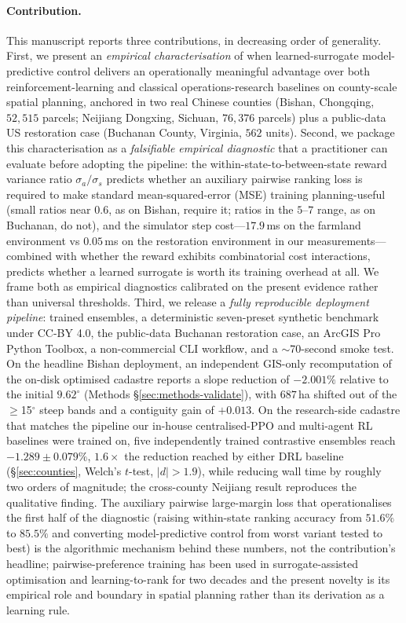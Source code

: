 \documentclass[11pt]{article}
\begin{document}
\paragraph{Contribution.} This manuscript reports three contributions, in decreasing order of generality. First, we present an \emph{empirical characterisation} of when learned-surrogate model-predictive control delivers an operationally meaningful advantage over both reinforcement-learning and classical operations-research baselines on county-scale spatial planning, anchored in two real Chinese counties (Bishan, Chongqing, $52{,}515$ parcels; Neijiang Dongxing, Sichuan, $76{,}376$ parcels) plus a public-data US restoration case (Buchanan County, Virginia, $562$ units). Second, we package this characterisation as a \emph{falsifiable empirical diagnostic} that a practitioner can evaluate before adopting the pipeline: the within-state-to-between-state reward variance ratio $\sigma_a / \sigma_s$ predicts whether an auxiliary pairwise ranking loss is required to make standard mean-squared-error (MSE) training planning-useful (small ratios near $0.6$, as on Bishan, require it; ratios in the $5$--$7$ range, as on Buchanan, do not), and the simulator step cost---$17.9$\,ms on the farmland environment vs $0.05$\,ms on the restoration environment in our measurements---combined with whether the reward exhibits combinatorial cost interactions, predicts whether a learned surrogate is worth its training overhead at all. We frame both as empirical diagnostics calibrated on the present evidence rather than universal thresholds. Third, we release a \emph{fully reproducible deployment pipeline}: trained ensembles, a deterministic seven-preset synthetic benchmark under CC-BY 4.0, the public-data Buchanan restoration case, an ArcGIS Pro Python Toolbox, a non-commercial CLI workflow, and a $\sim$70-second smoke test. On the headline Bishan deployment, an independent GIS-only recomputation of the on-disk optimised cadastre reports a slope reduction of $-2.001\%$ relative to the initial $9.62^{\circ}$ (Methods \S\ref{sec:methods-validate}), with $687$\,ha shifted out of the $\geq$15$^\circ$ steep bands and a contiguity gain of $+0.013$. On the research-side cadastre that matches the pipeline our in-house centralised-PPO and multi-agent RL baselines were trained on, five independently trained contrastive ensembles reach $-1.289 \pm 0.079\%$, $1.6\times$ the reduction reached by either DRL baseline (\S\ref{sec:counties}, Welch's $t$-test, $|d|>1.9$), while reducing wall time by roughly two orders of magnitude; the cross-county Neijiang result reproduces the qualitative finding. The auxiliary pairwise large-margin loss \citep{burges2005learning,joachims2002optimizing} that operationalises the first half of the diagnostic (raising within-state ranking accuracy from $51.6\%$ to $85.5\%$ and converting model-predictive control from worst variant tested to best) is the algorithmic mechanism behind these numbers, not the contribution's headline; pairwise-preference training has been used in surrogate-assisted optimisation and learning-to-rank for two decades \citep{joachims2002optimizing,burges2005learning,christiano2017deep,ouyang2022training} and the present novelty is its empirical role and boundary in spatial planning rather than its derivation as a learning rule.
\end{document}
